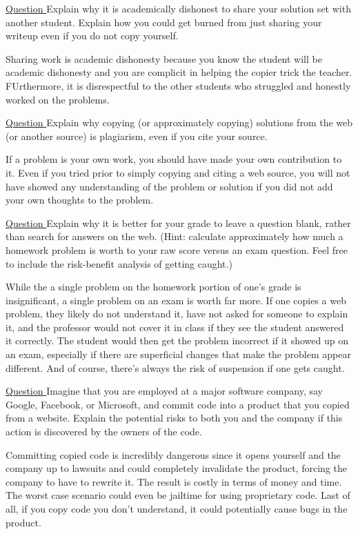 \documentclass[a4paper]{article}
\begin{document}
\underline{Question }
Explain why it is academically dishonest to share your solution set with another student. Explain how you could get burned from just sharing your writeup even if you do not copy yourself.

Sharing work is academic dishonesty because you know the student will be academic dishonesty and you are complicit in helping the copier trick the teacher. FUrthermore, it is disrespectful to the other students who struggled and honestly worked on the problems.

\underline{Question }
Explain why copying (or approximately copying) solutions from the web (or another source) is plagiarism, even if you cite your source.

If a problem is your own work, you should have made your own contribution to it. Even if you tried prior to simply copying and citing a web source, you will not have showed any understanding of the problem or solution if you did not add your own thoughts to the problem.

\underline{Question }
Explain why it is better for your grade to leave a question blank, rather than search for answers on the web. (Hint: calculate approximately how much a homework problem is worth to your raw score versus an exam question. Feel free to include the risk-benefit analysis of getting caught.)

While the a single problem on the homework portion of one's grade is insignificant, a single problem on an exam is worth far more. If one copies a web problem, they likely do not understand it, have not asked for someone to explain it, and the professor would not cover it in class if they see the student answered it correctly. The student would then get the problem incorrect if it showed up on an exam, especially if there are superficial changes that make the problem appear different. And of course, there's always the risk of suspension if one gets caught.

\underline{Question }
Imagine that you are employed at a major software company, say Google, Facebook, or Microsoft, and commit code into a product that you copied from a website. Explain the potential risks to both you and the company if this action is discovered by the owners of the code.

Committing copied code is incredibly dangerous since it opens yourself and the company up to lawsuits and could completely invalidate the product, forcing the company to have to rewrite it. The result is costly in terms of money and time. The worst case scenario could even be jailtime for using proprietary code. Last of all, if you copy code you don't understand, it could potentially cause bugs in the product.
\end{document}
